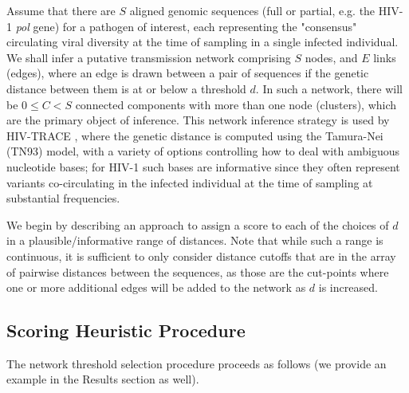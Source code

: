 \documentclass[utf8]{FrontiersinHarvard} %
\newcommand{\TODO}[1]{{\color{red}{#1}}}
\begin{document}
Assume that there are $S$ aligned genomic sequences (full or partial, e.g. the
HIV-1 \textit{pol} gene) for a pathogen of interest, each representing the "consensus"
circulating viral diversity at the time of sampling in a single infected
individual. We shall infer a putative transmission network comprising $S$
nodes, and $E$ links (edges), where an edge is drawn between a pair of
sequences if the genetic distance between them is at or below a threshold $d$.
In such a network, there will be $0 \leq C < S$ connected components with more
than one node (clusters), which are the primary object of inference. This
network inference strategy is used by HIV-TRACE
\citep{kosakovsky_pond_hiv-trace_2018}, where the genetic distance is computed
using the Tamura-Nei (TN93) \citep{tamura_estimation_1993} model, with a
variety of options controlling how to deal with ambiguous nucleotide bases; for
HIV-1 such bases are informative since they often represent variants
co-circulating in the infected individual at the time of sampling at
substantial frequencies\TODO{SAR -- Reference}.

We begin by describing an approach to assign a score to each of the choices of
$d$ in a plausible/informative range of distances. Note that while such a range
is continuous, it is sufficient to only consider distance cutoffs that are in
the array of pairwise distances between the sequences, as those are the
cut-points where one or more additional edges will be added to the network as
$d$ is increased.

\subsection{Scoring Heuristic Procedure}

The network threshold selection procedure proceeds as follows (we provide an
example in the Results section as well).
\end{document}
